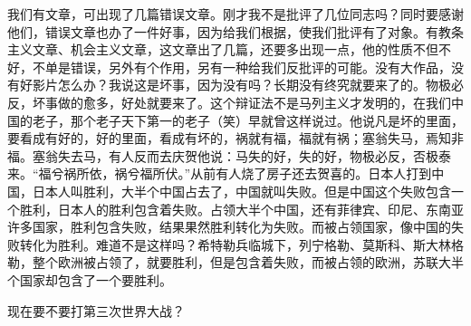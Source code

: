 我们有文章，可出现了几篇错误文章。刚才我不是批评了几位同志吗？同时要感谢他们，错误文章也办了一件好事，因为给我们根据，使我们批评有了对象。有教条主义文章、机会主义文章，这文章出了几篇，还要多出现一点，他的性质不但不好，不单是错误，另外有个作用，另有一种给我们反批评的可能。没有大作品，没有好影片怎么办？我说这是坏事，因为没有吗？长期没有终究就要来了的。物极必反，坏事做的愈多，好处就要来了。这个辩证法不是马列主义才发明的，在我们中国的老子，那个老子天下第一的老子（笑）早就曾这样说过。他说凡是坏的里面，要看成有好的，好的里面，看成有坏的，祸就有福，福就有祸；塞翁失马，焉知非福。塞翁失去马，有人反而去庆贺他说：马失的好，失的好，物极必反，否极泰来。“福兮祸所依，祸兮福所伏。”从前有人烧了房子还去贺喜的。日本人打到中国，日本人叫胜利，大半个中国占去了，中国就叫失败。但是中国这个失败包含一个胜利，日本人的胜利包含着失败。占领大半个中国，还有菲律宾、印尼、东南亚许多国家，胜利包含失败，结果果然胜利转化为失败。而被占领国家，像中国的失败转化为胜利。难道不是这样吗？希特勒兵临城下，列宁格勒、莫斯科、斯大林格勒，整个欧洲被占领了，就要胜利，但是包含着失败，而被占领的欧洲，苏联大半个国家却包含了一个要胜利。

现在要不要打第三次世界大战？

